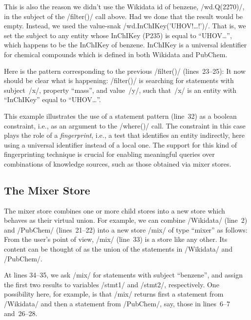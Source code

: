 This is also the reason we didn't use the Wikidata id of benzene, \code/wd.Q(2270)/, in the subject of the \code/filter()/ call above.
Had we done that the result would be empty.
Instead, we used the value-snak \code/wd.InChIKey('UHOV!\dots!')/.
That is, we set the subject to any entity whose InChIKey (P235) is equal to ``UHOV\dots'', which happens to be the InChIKey of benzene.
InChIKey is a universal identifier for chemical compounds which is defined in both Wikidata and PubChem.


Here is the pattern corresponding to the previous \code/filter()/ (lines~23--25):
%
It now should be clear what is happening: \code/filter()/ is searching for statements with subject~\code/x/, property ``mass'', and value~\code/y/, such that~\code/x/ is an entity with ``InChIKey'' equal to ``UHOV\dots''.


This example illustrates the use of a statement pattern (line~32) as a boolean constraint, i.e., as an argument to the \code/where()/ call.
The constraint in this case plays the role of a \emph{fingerprint}, i.e., a test that identifies an entity indirectly, here using a universal identifier instead of a local one.
The support for this kind of fingerprinting technique is crucial for enabling meaningful queries over combinations of knowledge sources, such as those obtained via mixer stores.


\subsection{The Mixer Store}%
\label{sub:the-mixer-store}


The mixer store combines one or more child stores into a new store which behaves as their virtual union.
For example, we can combine \code/Wikidata/ (line~2) and \code/PubChem/ (lines~21--22) into a new store \code/mix/ of type ``mixer'' as follows:
%
From the user's point of view, \code/mix/ (line~33) is a store like any other.
Its content can be thought of as the union of the statements in \code/Wikidata/ and \code/PubChem/.

At lines 34--35, we ask \code/mix/ for statements with subject ``benzene'', and assign the first two results to variables \code/stmt1/ and \code/stmt2/, respectively.
One possibility here, for example, is that \code/mix/ returns first a statement from \code/Wikidata/ and then a statement from \code/PubChem/, say, those in lines~6--7 and~26--28.


